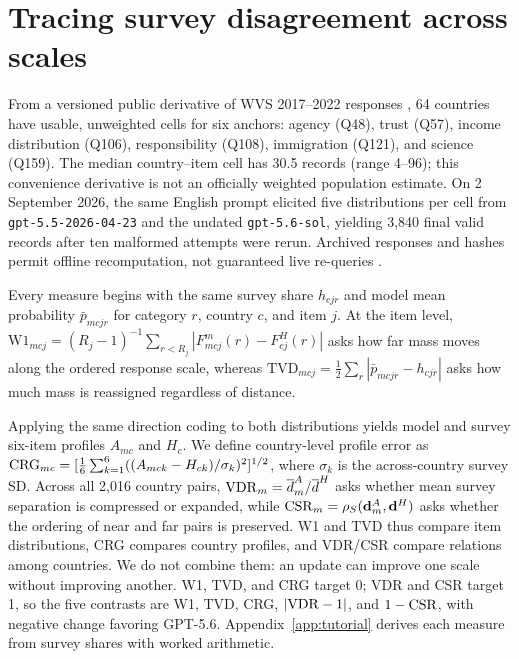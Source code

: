 \section{Tracing survey disagreement across scales}

From a versioned public derivative of WVS 2017--2022 responses
\citep{oxfordllmswvs,haerpfer2022wvs}, 64 countries have usable, unweighted
cells for six anchors: agency (Q48), trust (Q57), income distribution (Q106),
responsibility (Q108), immigration (Q121), and science (Q159). The median
country--item cell has 30.5 records (range 4--96); this convenience derivative
is not an officially weighted population estimate. On 2 September 2026,
the same English prompt elicited five distributions per cell from
\texttt{gpt-5.5-2026-04-23} and the undated \texttt{gpt-5.6-sol}, yielding
3,840 final valid records after ten malformed attempts were rerun.
Archived responses and hashes permit offline recomputation, not guaranteed
live re-queries \citep{openai2026models,openai2026changelog}.

Every measure begins with the same survey share $h_{cjr}$ and model mean probability
$\bar p_{mcjr}$ for category $r$, country $c$, and item $j$. At the item level,
$\mathrm{W1}_{mcj}=(R_j-1)^{-1}\sum_{r<R_j}|F^m_{mcj}(r)-F^H_{cj}(r)|$ asks how far
mass moves along the ordered response scale, whereas
$\mathrm{TVD}_{mcj}=\tfrac12\sum_r|\bar p_{mcjr}-h_{cjr}|$ asks how much mass is
reassigned regardless of distance.

Applying the same direction coding to both distributions yields model and survey
six-item profiles $A_{mc}$ and $H_c$. We define country-level profile error as
$\mathrm{CRG}_{mc}=[\tfrac16\sum_{k=1}^6((A_{mck}-H_{ck})/\sigma_k)^2]^{1/2}$, where
$\sigma_k$ is the across-country survey SD. Across all 2,016 country pairs,
$\mathrm{VDR}_m=\overline d^A_m/\overline d^H$ asks whether mean survey separation is compressed
or expanded, while $\mathrm{CSR}_m=\rho_S(\mathbf d^A_m,\mathbf d^H)$ asks whether the ordering
of near and far pairs is preserved. W1 and TVD thus compare item distributions, CRG
compares country profiles, and VDR/CSR compare relations among countries. We do not
combine them: an update can improve one scale without improving another. W1, TVD, and
CRG target 0; VDR and CSR target 1, so the five contrasts are W1, TVD, CRG,
$|\mathrm{VDR}-1|$, and $1-\mathrm{CSR}$, with negative change favoring GPT-5.6. Appendix~\ref{app:tutorial}
derives each measure from survey shares with worked arithmetic.

